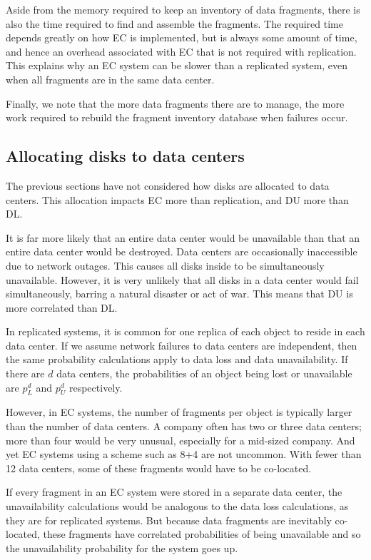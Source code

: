 Aside from the memory required to keep an inventory of data fragments, there is also the time required to find and assemble the fragments. The required time depends greatly on how EC is implemented, but is always some amount of time, and hence an overhead associated with EC that is not required with replication. This explains why an EC system can be slower than a replicated system, even when all fragments are in the same data center.

Finally, we note that the more data fragments there are to manage, the more work required to rebuild the fragment inventory database when failures occur.

\subsection{Allocating disks to data centers} \label{DC}

The previous sections have not considered how disks are allocated to data centers. This allocation impacts EC more than replication, and DU more than DL.

It is far more likely that an entire data center would be unavailable than that an entire data center would be destroyed. Data centers are occasionally inaccessible due to network outages. This causes all disks inside to be simultaneously unavailable. However, it is very unlikely that all disks in a data center would fail simultaneously, barring a natural disaster or act of war. This means that DU is more correlated than DL.

In replicated systems, it is common for one replica of each object to reside in each data center. If we assume network failures to data centers are independent, then the same probability calculations apply to data loss and data unavailability. If there are $d$ data centers, the probabilities of an object being lost or unavailable are $p_L^d$ and $p_U^d$ respectively.

However, in EC systems, the number of fragments per object is typically larger than the number of data centers. A company often has two or three data centers; more than four would be very unusual, especially for a mid-sized company. And yet EC systems using a scheme such as 8+4 are not uncommon. With fewer than 12 data centers, some of these fragments would have to be co-located.

If every fragment in an EC system were stored in a separate data center, the unavailability calculations would be analogous to the data loss calculations, as they are for replicated systems. But because data fragments are inevitably co-located, these fragments have correlated probabilities of being unavailable and so the unavailability probability for the system goes up. 

